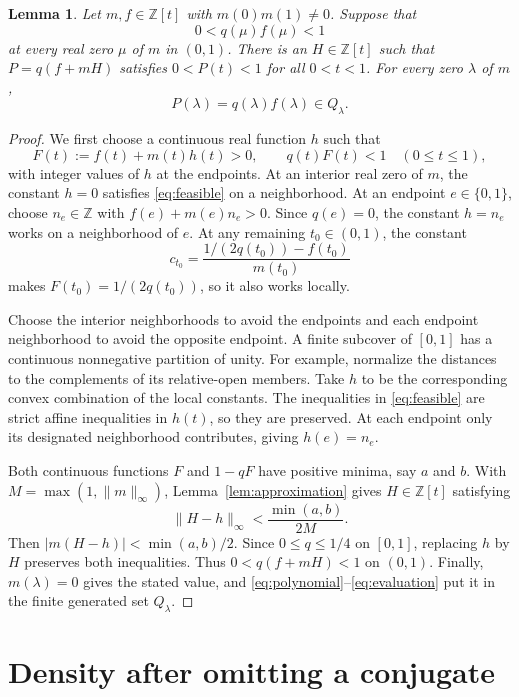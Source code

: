 \documentclass[11pt]{article}
\newtheorem{lemma}[theorem]{Lemma}
\newcommand{\Z}{\mathbb Z}
\begin{document}
\begin{lemma}\label{lem:residue}
Let $m,f\in\Z[t]$ with $m(0)m(1)\ne0$. Suppose that
\[
 0<q(\mu)f(\mu)<1
\]
at every real zero $\mu$ of $m$ in $(0,1)$. There is an $H\in\Z[t]$
such that $P=q(f+mH)$ satisfies $0<P(t)<1$ for all $0<t<1$.
For every zero $\lambda$ of $m$,
\[
 P(\lambda)=q(\lambda)f(\lambda)\in Q_\lambda.
\]
\end{lemma}
\begin{proof}
We first choose a continuous real function $h$ such that
\begin{equation}\label{eq:feasible}
 F(t):=f(t)+m(t)h(t)>0,\qquad q(t)F(t)<1
 \quad(0\le t\le1),
\end{equation}
with integer values of $h$ at the endpoints.
At an interior real zero of $m$, the constant $h=0$ satisfies
\eqref{eq:feasible} on a neighborhood. At an endpoint $e\in\{0,1\}$,
choose $n_e\in\Z$ with $f(e)+m(e)n_e>0$. Since $q(e)=0$, the
constant $h=n_e$ works on a neighborhood of $e$.
At any remaining $t_0\in(0,1)$, the constant
\[
 c_{t_0}=\frac{1/(2q(t_0))-f(t_0)}{m(t_0)}
\]
makes $F(t_0)=1/(2q(t_0))$, so it also works locally.

Choose the interior neighborhoods to avoid the endpoints and each endpoint
neighborhood to avoid the opposite endpoint. A finite subcover of $[0,1]$
has a continuous nonnegative partition of unity. For example, normalize
the distances to the complements of its relative-open members. Take $h$
to be the corresponding convex combination of the local constants.
The inequalities in \eqref{eq:feasible} are strict affine inequalities
in $h(t)$, so they are preserved. At each endpoint only its designated
neighborhood contributes, giving $h(e)=n_e$.

Both continuous functions $F$ and $1-qF$ have positive minima, say
$a$ and $b$. With $M=\max(1,\|m\|_\infty)$, Lemma~\ref{lem:approximation}
gives $H\in\Z[t]$ satisfying
\[
 \|H-h\|_\infty<\frac{\min(a,b)}{2M}.
\]
Then $|m(H-h)|<\min(a,b)/2$. Since $0\le q\le1/4$ on $[0,1]$,
replacing $h$ by $H$ preserves both inequalities. Thus
$0<q(f+mH)<1$ on $(0,1)$. Finally, $m(\lambda)=0$ gives the
stated value, and \eqref{eq:polynomial}--\eqref{eq:evaluation} put it
in the finite generated set $Q_\lambda$.
\end{proof}

\section{Density after omitting a conjugate}
\end{document}
